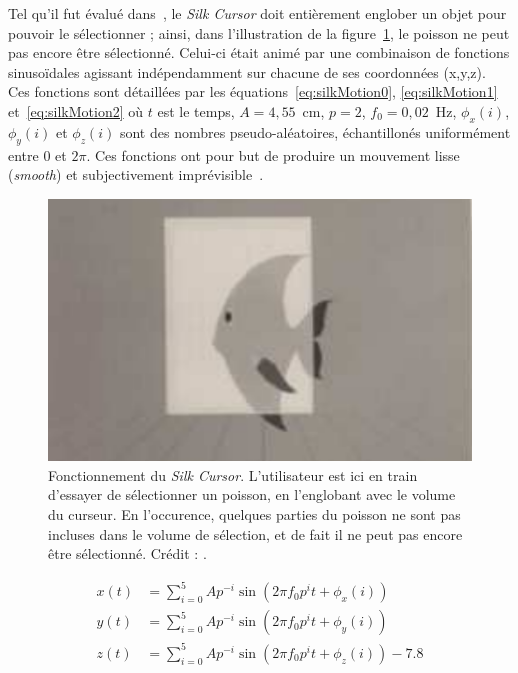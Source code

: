 	Tel qu'il fut évalué dans~\cite{zhai1994silk}, le \emph{Silk Cursor} doit entièrement englober un objet pour pouvoir le sélectionner ; ainsi, dans l'illustration de la figure~\ref{fig:silk}, le poisson ne peut pas encore être sélectionné. Celui-ci était animé par une combinaison de fonctions sinusoïdales agissant indépendamment sur chacune de ses coordonnées (x,y,z). Ces fonctions sont détaillées par les équations~\ref{eq:silkMotion0}, \ref{eq:silkMotion1} et~\ref{eq:silkMotion2} où $t$ est le temps, $A = 4,55$~cm, $p = 2$, $f_{0} = 0,02$~Hz, 	$\phi_{x}(i)$, $\phi_{y}(i)$ et $\phi_{z}(i)$ sont des nombres pseudo-aléatoires, échantillonés uniformément entre $0$ et $2\pi$. Ces fonctions ont pour but de produire un mouvement lisse (\emph{smooth}) et subjectivement imprévisible~\cite{zhai1993human}.
	
	\begin{figure}[H]
		\centering
		\includegraphics[width=\textwidth]{figures/ch2/silk}
		\caption[Le \emph{Silk Cursor}]{Fonctionnement du \emph{Silk Cursor}. L'utilisateur est ici en train d'essayer de sélectionner un poisson, en l'englobant avec le volume du curseur. En l'occurence, quelques parties du poisson ne sont pas incluses dans le volume de sélection, et de fait il ne peut pas encore être sélectionné. Crédit : \cite{zhai1994silk}.}
		\label{fig:silk}
	\end{figure}
	
	\begin{align}
		\label{eq:silkMotion0}
		x(t) &= \sum_{i=0}^{5} Ap^{-i} \sin \left( 2\pi{}f_{0}p^{i}t + \phi_{x}(i) \right) \\
		\label{eq:silkMotion1}
		y(t) &= \sum_{i=0}^{5} Ap^{-i} \sin \left( 2\pi{}f_{0}p^{i}t + \phi_{y}(i) \right) \\
		\label{eq:silkMotion2}
		z(t) &= \sum_{i=0}^{5} Ap^{-i} \sin \left( 2\pi{}f_{0}p^{i}t + \phi_{z}(i) \right) - 7.8
	\end{align}
	
